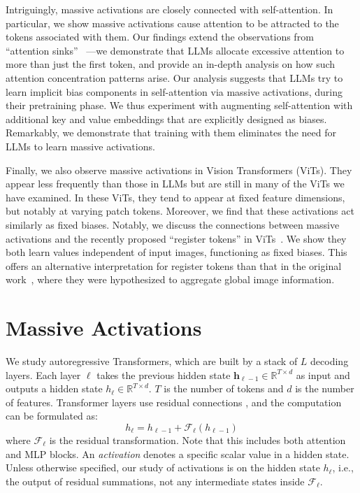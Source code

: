 \documentclass[10pt]{article}
\newcommand{\mbf}[1]{\mathbf{#1}}
\begin{document}
Intriguingly, massive activations are closely connected with self-attention. In particular, we show massive activations cause attention to be attracted to the tokens associated with them. Our findings extend the observations from ``attention sinks'' ~\citep{xiao2023sink}---we demonstrate that LLMs allocate excessive attention to more than just the first token, and provide an in-depth analysis on how such attention concentration patterns arise. Our analysis suggests that LLMs try to learn implicit bias components in self-attention via massive activations, during their pretraining phase. We thus experiment with augmenting self-attention with additional key and value embeddings that are explicitly designed as biases. Remarkably, we demonstrate that training with them eliminates the need for LLMs to learn massive activations.

Finally, we also observe massive activations in Vision Transformers (ViTs). They appear less frequently than those in LLMs but are still in many of the ViTs we have examined. In these ViTs, they tend to appear at fixed feature dimensions, but notably at varying patch tokens. Moreover, we find that these activations act similarly as fixed biases. Notably, we discuss the connections between massive activations and the recently proposed ``register tokens'' in ViTs~\citep{darcet2023register}. We show they both learn values independent of input images, functioning as fixed biases. This offers an alternative interpretation for register tokens than that in the original work~\citep{darcet2023register}, where they were hypothesized to aggregate global image information. 


\section{Massive Activations}\label{section-def}
We study autoregressive Transformers, which are built by a stack of $L$ decoding layers. Each layer $\ell$ takes the previous hidden state $\mbf{h}_{\ell-1}\in \mathbb{R}^{T\times d}$ as input and outputs a hidden state $h_{\ell}\in \mathbb{R}^{T\times d}$. $T$ is the number of tokens and $d$ is the number of features. Transformer layers use residual connections \citep{he2016resnet}, and the computation can be formulated as:
\begin{equation}
    h_{\ell} = h_{\ell-1} + \mathcal{F}_{\ell}(h_{\ell-1})
\end{equation}
where $\mbf{\mathcal{F}_{\ell}}$ is the residual transformation. Note that this includes both attention and MLP blocks. An \emph{activation} denotes a specific scalar value in a hidden state. Unless otherwise specified, our study of  activations is  on the hidden state $h_{\ell}$, i.e., the output of residual summations, not any intermediate states inside $\mbf{\mathcal{F}_{\ell}}$.  
\end{document}
